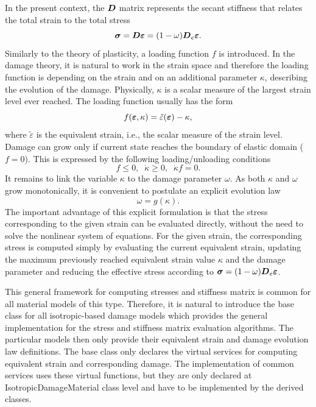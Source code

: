 \documentclass[epsf,a4paper]{article}
\newcommand{\mbf}[1]{\mbox{\boldmath$#1$}}
\begin{document}
 In the present context, the $\mbf{D}$ matrix represents the secant
 stiffness that relates the total strain to the total stress
 $$
 \mbf{\sigma}=\mbf{D}\mbf{\varepsilon} = (1-\omega)\mbf{D}_e\mbf{\varepsilon}.
 $$
 Similarly to the theory of plasticity, a loading function $f$ is
 introduced. In the damage theory, it is natural to work in the strain
 space and therefore the loading function is depending on the strain
 and on an additional parameter $\kappa$, describing the evolution of
 the damage. Physically, $\kappa$ is a scalar measure of the
 largest strain level ever reached. The loading function usually has
 the form
 $$
 f(\mbf{\varepsilon}, \kappa) = \tilde\varepsilon(\mbf{\varepsilon}) - \kappa,
 $$
 where $\tilde\varepsilon$ is the equivalent strain, i.e., the scalar
 measure of the strain level.
 Damage can grow only if current state reaches the boundary of elastic
 domain ($f=0$). This is expressed by the following loading/unloading
 conditions
 $$
 f \le 0,\;\;\dot\kappa \ge0,\;\;\dot\kappa f = 0.
 $$ 
 It remains to link the variable $\kappa$ to the damage parameter
 $\omega$. As both $\kappa$ and $\omega$ grow monotonically, it is
 convenient to postulate an explicit evolution law
 $$
 \omega = g(\kappa).
 $$
 The important advantage of this explicit formulation is that the
 stress corresponding to the given strain can be evaluated directly,
 without the need to solve the nonlinear system of equations.
 For the given strain, the corresponding stress is computed simply by
 evaluating the current equivalent strain, updating the maximum
 previously reached equivalent strain value $\kappa$  and the damage
 parameter and reducing the effective stress according to $\mbf{\sigma}
 = (1-\omega)\mbf{D}_e \mbf{\varepsilon}$.

 This general framework for computing stresses and
 stiffness matrix is  common for all material models of this type.
 Therefore, it is natural to introduce
 the base class for all isotropic-based damage models which provides the general
 implementation for the stress and stiffness matrix evaluation
 algorithms. The particular models then only provide their equivalent
 strain and damage evolution law definitions.
 The base class only declares the virtual services for computing equivalent
 strain and corresponding damage. The implementation of common services
 uses these virtual functions, but they are only declared at
 IsotropicDamageMaterial class level and have to be
 implemented by the derived classes.
\end{document}

